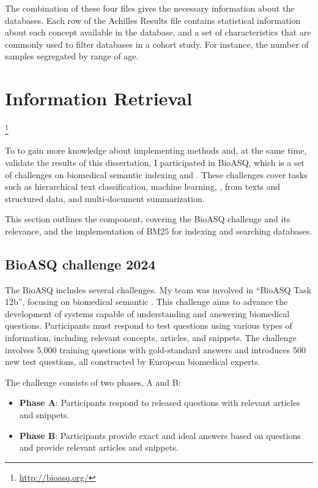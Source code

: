 \hspace{1cm}

The combination of these four files gives the necessary information about the databases. Each row of the Achilles Results file contains statistical information about each concept available in the database, and a set of characteristics that are commonly used to filter databases in a cohort study. For instance, the number of samples segregated by range of age. 


\section{Information Retrieval}\footnote{\url{http://bioasq.org/}}

To to gain more knowledge about implementing {\ir} methods and, at the same time, validate the {\ir} results of this dissertation, I participated in BioASQ, which is a set of challenges on biomedical semantic indexing and {\qa}. These challenges cover tasks such as hierarchical text classification, machine learning, {\ir}, {\qa} from texts and structured data, and multi-document summarization.

This section outlines the {\ir} component, covering the BioASQ challenge and its relevance, and the implementation of BM25 for indexing and searching databases.


\subsection{BioASQ challenge 2024}
\label{bioasq}

The BioASQ includes several challenges. My team was involved in ``BioASQ Task 12b'', focusing on biomedical semantic {\qa}. This challenge aims to advance the development of systems capable of understanding and answering biomedical questions. Participants must respond to test questions using various types of information, including relevant concepts, articles, and snippets. The challenge involves 5,000 training questions with gold-standard answers and introduces 500 new test questions, all constructed by European biomedical experts. 

The challenge consists of two phases, A and B:

\begin{itemize}
    \item \textbf{Phase A}: Participants respond to released questions with relevant articles and snippets.
    \item \textbf{Phase B}: Participants provide exact and ideal answers based on questions and provide relevant articles and snippets.
\end{itemize}

